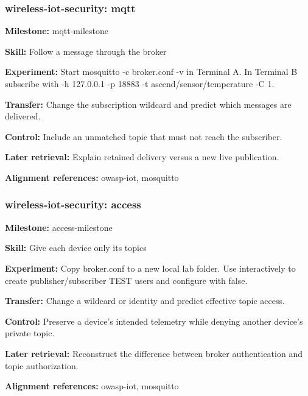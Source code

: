 \subsubsection{wireless-iot-security: mqtt}
\noindent\textbf{Milestone:} mqtt-milestone\par
\noindent\textbf{Skill:} Follow a message through the broker\par
\noindent\textbf{Experiment:} Start mosquitto -c broker.conf -v in Terminal A. In Terminal B subscribe with  -h 127.0.0.1 -p 18883 -t ascend/sensor/temperature -C 1.\par
\noindent\textbf{Transfer:} Change the subscription wildcard and predict which messages are delivered.\par
\noindent\textbf{Control:} Include an unmatched topic that must not reach the subscriber.\par
\noindent\textbf{Later retrieval:} Explain retained delivery versus a new live publication.\par
\noindent\textbf{Alignment references:} owasp-iot, mosquitto\par
\subsubsection{wireless-iot-security: access}
\noindent\textbf{Milestone:} access-milestone\par
\noindent\textbf{Skill:} Give each device only its topics\par
\noindent\textbf{Experiment:} Copy broker.conf to a new local lab folder. Use  interactively to create publisher/subscriber TEST users and configure  with  false.\par
\noindent\textbf{Transfer:} Change a wildcard or identity and predict effective topic access.\par
\noindent\textbf{Control:} Preserve a device's intended telemetry while denying another device's private topic.\par
\noindent\textbf{Later retrieval:} Reconstruct the difference between broker authentication and topic authorization.\par
\noindent\textbf{Alignment references:} owasp-iot, mosquitto\par
